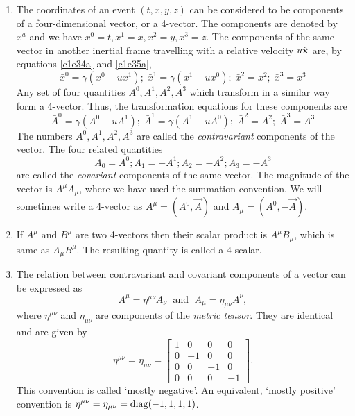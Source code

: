 \begin{enumerate}
\item The coordinates of an event $(t, x, y, z)$ can be considered to be
components of a four-dimensional vector, or a 4-vector. The components are
denoted by $x^a$ and we have $x^0 = t, x^1 = x, x^2 = y, x^3 = z$. The 
components of the same vector in another inertial frame travelling with a 
relative velocity $u\hat{\mathbf{x}}$ are, by equations \eqref{c1e34a} and \eqref{c1e35a},
\[
\bar{x}^0 = \gamma(x^0 - ux^1);\;
\bar{x}^1 = \gamma(x^1 - ux^0);\;
\bar{x}^2 = x^2;\;
\bar{x}^3 = x^3
\]
Any set of four quantities $A^0, A^1, A^2, A^3$ which transform in a similar
way form a 4-vector. Thus, the transformation equations for these components
are
\begin{equation}\label{c1e46}
\bar{A}^0 = \gamma(A^0 - uA^1);\;
\bar{A}^1 = \gamma(A^1 - uA^0);\;
\bar{A}^2 = A^2;\;
\bar{A}^3 = A^3
\end{equation}
The numbers $A^0, A^1, A^2, A^3$ are called the \emph{contravariant} components
of the vector. The four related quantities
\begin{equation}\label{c1e47}
A_0 = A^0; A_1 = -A^1; A_2 = -A^2; A_3 = -A^3
\end{equation}
are called the \emph{covariant} components of the same vector. The magnitude of
the vector is $A^\mu A_\mu$, where we have used the summation convention. We 
will sometimes write a 4-vector as $A^\mu = (A^0, \vec{A})$ and $A_\mu= 
(A^0, -\vec{A})$.

\item If $A^\mu$ and $B^\mu$ are two 4-vectors then their scalar product is 
$A^\mu B_\mu$, which is same as $A_\mu B^\mu$. The resulting quantity is called 
a 4-scalar. 

\item The relation between contravariant and covariant components of a vector
can be expressed as
\begin{equation}\label{c1e48}
A^\mu = \eta^{\mu\nu}A_\nu\;\text{ and }\; A_\mu = \eta_{\mu\nu}A^\nu,
\end{equation}
where $\eta^{\mu\nu}$ and $\eta_{\mu\nu}$ are components of the \emph{metric 
tensor}. They are identical and are given by
\begin{equation}\label{c1e49}
\eta^{\mu\nu} = \eta_{\mu\nu} = \begin{bmatrix}1 & 0 & 0 & 0 \\
0 & -1 & 0 & 0 \\
0 & 0 & -1 & 0 \\
0 & 0 & 0 & -1
\end{bmatrix}.
\end{equation}
This convention is called `mostly negative'. An equivalent, `mostly positive'
convention is $\eta^{\mu\nu} = \eta_{\mu\nu} = \operatorname{diag}(-1, 1, 1, 1)$.


\end{enumerate}
